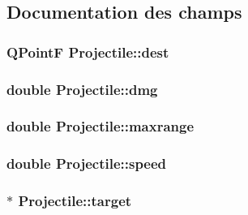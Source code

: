 \subsection{Documentation des champs}
\hypertarget{classProjectile_a15091a3a02fbfac2dd4fb44ac9cbceab}{
\subsubsection[{dest}]{\setlength{\rightskip}{0pt plus 5cm}QPointF {\bf Projectile::dest}}}
\label{classProjectile_a15091a3a02fbfac2dd4fb44ac9cbceab}
\hypertarget{classProjectile_ac94938ed5b3d3e01217bf72f80ad2e3d}{
\subsubsection[{dmg}]{\setlength{\rightskip}{0pt plus 5cm}double {\bf Projectile::dmg}}}
\label{classProjectile_ac94938ed5b3d3e01217bf72f80ad2e3d}
\hypertarget{classProjectile_a019db4c89ccf3eb291b06ba7b55f0754}{
\subsubsection[{maxrange}]{\setlength{\rightskip}{0pt plus 5cm}double {\bf Projectile::maxrange}}}
\label{classProjectile_a019db4c89ccf3eb291b06ba7b55f0754}
\hypertarget{classProjectile_aae1f5d683c71d152b6a12d922ec4714f}{
\subsubsection[{speed}]{\setlength{\rightskip}{0pt plus 5cm}double {\bf Projectile::speed}}}
\label{classProjectile_aae1f5d683c71d152b6a12d922ec4714f}
\hypertarget{classProjectile_ae5273bd2c6550b94f38310b69859b093}{
\subsubsection[{target}]{$\ast$ {\bf Projectile::target}}}
